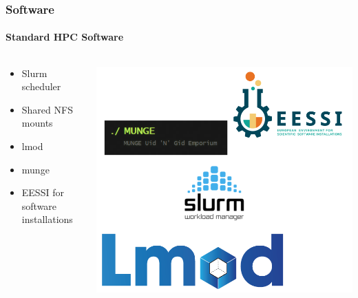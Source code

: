 \begin{frame}
	\frametitle{Software}
	\framesubtitle{Standard HPC Software}
	
	\begin{columns}[T]
		\begin{column}[c]{.5\textwidth}
			\begin{itemize}[label={$\color{UmUBlue}\bullet$}]
				\item Slurm scheduler
				\item Shared NFS mounts
				\item lmod
				\item munge
				\item EESSI for software installations
			\end{itemize}
		\end{column}
		\begin{column}[c]{.5\textwidth}
			\centering
			\includegraphics[width=.8\textwidth]{graphics/logos.png}
		\end{column}
	\end{columns}
\end{frame}
